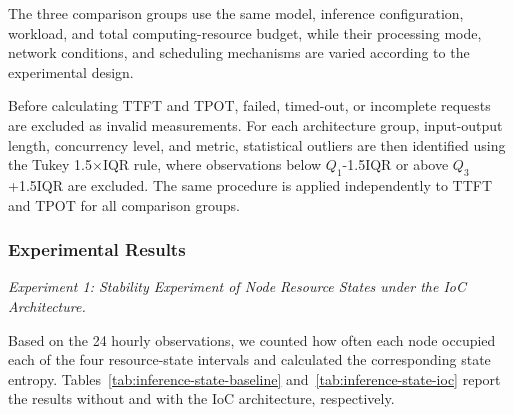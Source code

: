 \documentclass{ccjnl}
\begin{document}
The three comparison groups use the same model, inference configuration, workload, and total computing-resource budget, while their processing mode, network conditions, and scheduling mechanisms are varied according to the experimental design.

Before calculating TTFT and TPOT, failed, timed-out, or incomplete requests are excluded as invalid measurements. For each architecture group, input-output length, concurrency level, and metric, statistical outliers are then identified using the Tukey 1.5$\times$IQR rule, where observations below $Q_1$-1.5IQR or above $Q_3$+1.5IQR are excluded. The same procedure is applied independently to TTFT and TPOT for all comparison groups.

\subsubsection{Experimental Results}
\label{s6-2-3}

\par
{}
\noindent\textit{Experiment 1: Stability Experiment of Node Resource States under the IoC Architecture.}\par

Based on the 24 hourly observations, we counted how often each node occupied each of the four resource-state intervals and calculated the corresponding state entropy. Tables~\ref{tab:inference-state-baseline} and~\ref{tab:inference-state-ioc} report the results without and with the IoC architecture, respectively.
\end{document}
